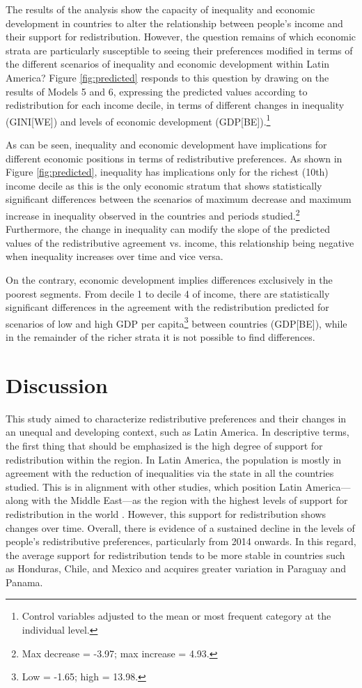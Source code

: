 \documentclass[utf8]{frontiersSCNS} %
\begin{document}
The results of the analysis show the capacity of inequality and economic development in countries to alter the relationship between people’s income and their support for redistribution. However, the question remains of which economic strata are particularly susceptible to seeing their preferences modified in terms of the different scenarios of inequality and economic development within Latin America? Figure \ref{fig:predicted} responds to this question by drawing on the results of Models 5 and 6, expressing the predicted values according to redistribution for each income decile, in terms of different changes in inequality (GINI[WE]) and levels of economic development (GDP[BE]).\footnote{Control variables adjusted to the mean or most frequent category at the individual level.}

As can be seen, inequality and economic development have implications for different economic positions in terms of redistributive preferences. As shown in Figure \ref{fig:predicted}, inequality has implications only for the richest (10th) income decile as this is the only economic stratum that shows statistically significant differences between the scenarios of maximum decrease and maximum increase in inequality observed in the countries and periods studied.\footnote{Max decrease = -3.97; max increase = 4.93.}  Furthermore, the change in inequality can modify the slope of the predicted values of the redistributive agreement vs. income, this relationship being negative when inequality increases over time and vice versa.

On the contrary, economic development implies differences exclusively in the poorest segments. From decile 1 to decile 4 of income, there are statistically significant differences in the agreement with the redistribution predicted for scenarios of low and high GDP per capita\footnote{Low = -1.65; high = 13.98.}  between countries (GDP[BE]), while in the remainder of the richer strata it is not possible to find differences.

\section{Discussion}

This study aimed to characterize redistributive preferences and their changes in an unequal and developing context, such as Latin America. In descriptive terms, the first thing that should be emphasized is the high degree of support for redistribution within the region. In Latin America, the population is mostly in agreement with the reduction of inequalities via the state in all the countries studied. This is in alignment with other studies, which position Latin America—along with the Middle East—as the region with the highest levels of support for redistribution in the world \parencite{DionEconomicDevelopmentIncome2010}. However, this support for redistribution shows changes over time. Overall, there is evidence of a sustained decline in the levels of people’s redistributive preferences, particularly from 2014 onwards. In this regard, the average support for redistribution tends to be more stable in countries such as Honduras, Chile, and Mexico and acquires greater variation in Paraguay and Panama.
\end{document}
